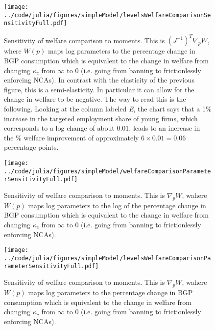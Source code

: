 \documentclass[11pt,english]{article}
\theoremstyle{remark}
\begin{document}
\begin{figure}[!htb]
	\texttt{[image: ../code/julia/figures/simpleModel/levelsWelfareComparisonSensitivityFull.pdf]}
	\caption{Sensitivity of welfare comparison to moments. This is $(J^{-1})^T \nabla_p W$, where $W(p)$ maps log parameters to the percentage change in BGP consumption which is equivalent to the change in welfare from changing $\kappa_c$ from $\infty$ to $0$ (i.e. going from banning to frictionlessly enforcing NCAs). In contrast with the elasticity of the previous figure, this is a semi-elasticity. In particular it can allow for the change in welfare to be negative. The way to read this is the following. Looking at the column labeled \textit{E}, the chart says that a 1\% increase in the targeted employment share of young firms, which corresponds to a log change of about $0.01$, leads to an increase in the \% welfare improvement of approximately $6 \times 0.01 = 0.06$ percentage points.}
	\label{levelsWelfareComparisonSensitivityFull}
\end{figure}

\begin{figure}[]
	\texttt{[image: ../code/julia/figures/simpleModel/welfareComparisonParameterSensitivityFull.pdf]}
	\caption{Sensitivity of welfare comparison to moments. This is $\nabla_p W$, wahere $W(p)$ maps log parameters to the log of the percentage change in BGP consumption which is equivalent to the change in welfare from changing $\kappa_c$ from $\infty$ to $0$ (i.e. going from banning to frictionlessly enforcing NCAs).}
	\label{welfareComparisonParameterSensitivityFull}
\end{figure}

\begin{figure}[]
	\texttt{[image: ../code/julia/figures/simpleModel/levelsWelfareComparisonParameterSensitivityFull.pdf]}
	\caption{Sensitivity of welfare comparison to moments. This is $\nabla_p W$, wahere $W(p)$ maps log parameters to the percentage change in BGP consumption which is equivalent to the change in welfare from changing $\kappa_c$ from $\infty$ to $0$ (i.e. going from banning to frictionlessly enforcing NCAs).}
	\label{levelsWelfareComparisonParameterSensitivityFull}
\end{figure}
\end{document}
